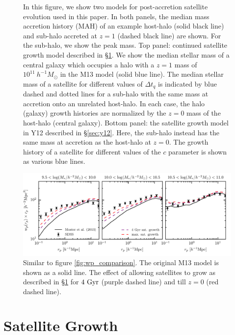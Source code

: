 \documentclass[useAMS,fleqn,usenatbib]{mnras}
\begin{document}
\begin{figure}
    \caption{In this figure, we show two models for post-accretion satellite evolution used in this paper.  In both panels, the median mass accretion history (MAH) of an example host-halo (solid black line) and sub-halo accreted at $z=1$ (dashed black line) are shown.  For the sub-halo, we show the peak mass.  Top panel: continued satellite growth model described in \S \ref{sec:sat_growth}.  We show the median stellar mass of a central galaxy which occupies a halo with a $z=1$ mass of $10^{11}~h^{-1}M_{\odot}$ in the M13 model (solid blue line).  The median stellar mass of a satellite for different values of $\Delta t_q$  is indicated by blue dashed and dotted lines for a sub-halo with the same mass at accretion onto an unrelated host-halo.  In each case, the halo (galaxy) growth histories are normalized by the $z=0$ mass of the host-halo (central galaxy).  Bottom panel: the satellite growth model in Y12 described in \S \ref{sec:y12}.  Here, the sub-halo instead has the same mass at accretion as the host-halo at $z=0$.  The growth history of a satellite for different values of the $c$ parameter is shown as various blue lines.}
    \label{fig:sat_growth_model}
\end{figure}

\begin{figure}
    \includegraphics[width=\textwidth]{figures/wp_sat_growth_comparison.pdf}
    \caption{Similar to figure \ref{fig:wp_comparison}.  The original M13 model is shown as a solid line.  The effect of allowing satellites to grow as described in \S \ref{sec:sat_growth} for $4~{\rm Gyr}$ (purple dashed line) and till $z=0$ (red dashed line).}
    \label{fig:wp_effect_comparison_sat_growth}
\end{figure}

\section{Satellite Growth}
\label{sec:sat_growth}  
\end{document}
